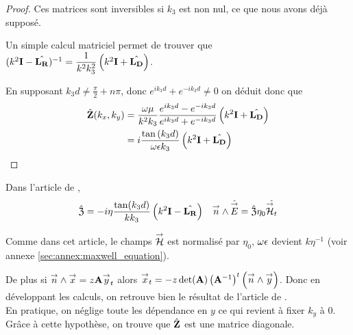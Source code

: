 \begin{proof}
            Ces matrices sont inversibles si \(k_3\) est non nul, ce que nous avons déjà supposé.

            Un simple calcul matriciel permet de trouver que \( (k^2\mathbf{I} - \hat{\mathbf{L_R}})^{-1} = \dfrac{1}{k^2k_3^2}\left(k^2 \mathbf{I} + \hat{\mathbf{L_D}}\right) \).

            En supposant \(k_3d \not = \frac{\pi}{2} + n\pi\), donc \(e^{ik_3d}+e^{-ik_3d}\not=0\) on déduit donc que
            \begin{align*}
                \hat {\mathbf{Z}}(k_x,k_y) &= \dfrac{\omega\mu}{k^2 k_3} \dfrac{e^{ik_3d} - e^{-ik_3d}}{e^{ik_3d} + e^{-ik_3d}}\left(k^2\mathbf{I} + \hat{\mathbf{L_D}}\right)
                \\
                &= i\dfrac{\tan\left(k_3d\right)}{\omega\epsilon k_3}\left(k^2\mathbf{I} + \hat{\mathbf{L_D}}\right)
            \end{align*}
        \end{proof}

        Dans l'article de \cite{marceaux_high-order_2000},
        \begin{align*}
            \hat{\mathfrak{Z}} = -i\eta\dfrac{\tan(k_3d)}{kk_3}\left(k^2\mathbf{I} - \hat{\mathbf{L_R}}\right) && {\overset{\rightarrow}{n}} \wedge \hat{{\overset{\rightarrow}{E}}} = \hat{\mathfrak{Z}} \eta_0\hat{{\overset{\rightarrow}{\mathcal{H}}}_t}
        \end{align*}

        Comme dans cet article, le champs \({\overset{\rightarrow}{\mathcal{H}}}\) est normalisé par \(\eta_0\), \(\omega\epsilon\) devient \(k\eta^{-1}\) (voir annexe \ref{sec:annex:maxwell_equation}).

        De plus si \({\overset{\rightarrow}{n}}\wedge {\overset{\rightarrow}{x}} = z\mathbf{A} {\overset{\rightarrow}{y}}_t\) alors \({\overset{\rightarrow}{x}}_t = -z\det(\mathbf{A})\left(\mathbf{A}^{-1}\right)^t\left({\overset{\rightarrow}{n}}\wedge{\overset{\rightarrow}{y}}\right)\). Donc en développant les calculs, on retrouve bien le résultat de l'article de \cite{marceaux_high-order_2000}.\\

        En pratique, on néglige toute les dépendance en \(y\) ce qui revient à fixer \(k_y\) à \(0\). Grâce à cette hypothèse, on trouve que \(\hat {\mathbf{Z}}\) est une matrice diagonale.

